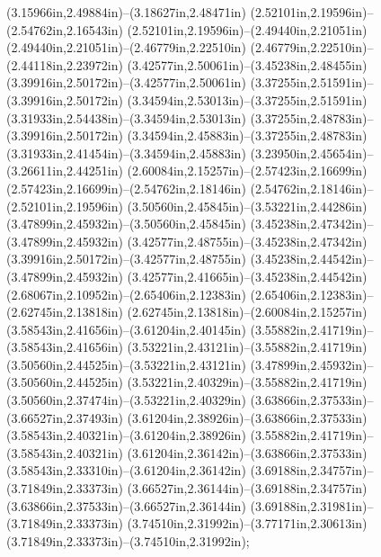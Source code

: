 (3.15966in,2.49884in)--(3.18627in,2.48471in) (2.52101in,2.19596in)--(2.54762in,2.16543in) (2.52101in,2.19596in)--(2.49440in,2.21051in) (2.49440in,2.21051in)--(2.46779in,2.22510in) (2.46779in,2.22510in)--(2.44118in,2.23972in) (3.42577in,2.50061in)--(3.45238in,2.48455in) (3.39916in,2.50172in)--(3.42577in,2.50061in) (3.37255in,2.51591in)--(3.39916in,2.50172in) (3.34594in,2.53013in)--(3.37255in,2.51591in) (3.31933in,2.54438in)--(3.34594in,2.53013in) (3.37255in,2.48783in)--(3.39916in,2.50172in) (3.34594in,2.45883in)--(3.37255in,2.48783in) (3.31933in,2.41454in)--(3.34594in,2.45883in) (3.23950in,2.45654in)--(3.26611in,2.44251in) (2.60084in,2.15257in)--(2.57423in,2.16699in) (2.57423in,2.16699in)--(2.54762in,2.18146in) (2.54762in,2.18146in)--(2.52101in,2.19596in) (3.50560in,2.45845in)--(3.53221in,2.44286in) (3.47899in,2.45932in)--(3.50560in,2.45845in) (3.45238in,2.47342in)--(3.47899in,2.45932in) (3.42577in,2.48755in)--(3.45238in,2.47342in) (3.39916in,2.50172in)--(3.42577in,2.48755in) (3.45238in,2.44542in)--(3.47899in,2.45932in) (3.42577in,2.41665in)--(3.45238in,2.44542in) (2.68067in,2.10952in)--(2.65406in,2.12383in) (2.65406in,2.12383in)--(2.62745in,2.13818in) (2.62745in,2.13818in)--(2.60084in,2.15257in) (3.58543in,2.41656in)--(3.61204in,2.40145in) (3.55882in,2.41719in)--(3.58543in,2.41656in) (3.53221in,2.43121in)--(3.55882in,2.41719in) (3.50560in,2.44525in)--(3.53221in,2.43121in) (3.47899in,2.45932in)--(3.50560in,2.44525in) (3.53221in,2.40329in)--(3.55882in,2.41719in) (3.50560in,2.37474in)--(3.53221in,2.40329in) (3.63866in,2.37533in)--(3.66527in,2.37493in) (3.61204in,2.38926in)--(3.63866in,2.37533in) (3.58543in,2.40321in)--(3.61204in,2.38926in) (3.55882in,2.41719in)--(3.58543in,2.40321in) (3.61204in,2.36142in)--(3.63866in,2.37533in) (3.58543in,2.33310in)--(3.61204in,2.36142in) (3.69188in,2.34757in)--(3.71849in,2.33373in) (3.66527in,2.36144in)--(3.69188in,2.34757in) (3.63866in,2.37533in)--(3.66527in,2.36144in) (3.69188in,2.31981in)--(3.71849in,2.33373in) (3.74510in,2.31992in)--(3.77171in,2.30613in) (3.71849in,2.33373in)--(3.74510in,2.31992in);
